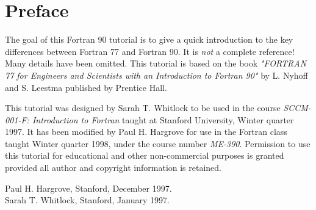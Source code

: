 \section{Preface}

The goal of this Fortran 90 tutorial is to give a quick introduction to
the key differences between Fortran 77 and Fortran 90. It is
\textit{not} a complete reference! Many details have been omitted. This
tutorial is based on the book \textit{"FORTRAN 77 for Engineers and
Scientists with an Introduction to Fortran 90"} by L. Nyhoff and S.
Leestma published by Prentice Hall.

This tutorial was designed by Sarah T. Whitlock to be used in the course
\textit{SCCM-001-F: Introduction to Fortran} taught at Stanford
University, Winter quarter 1997. It has been modified by Paul H.
Hargrove for use in the Fortran class taught Winter quarter 1998, under
the course number \textit{ME-390}. Permission to use this tutorial for
educational and other non-commercial purposes is granted provided all
author and copyright information is retained.

Paul H. Hargrove, Stanford, December 1997. \\
Sarah T. Whitlock, Stanford, January 1997.
